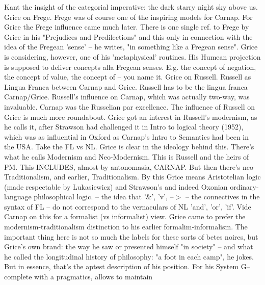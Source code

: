 \documentclass[10pt,titlepage]{book}
\begin{document}
{Kant the insight of the  categorial imperative: the dark starry night sky 
above us. 
Grice  on Frege. Frege was of course one of the inspiring models for 
Carnap. For  Grice the Frege influence came much later. There is one single ref. 
to Frege by  Grice in his "Prejudices and Predilections" and this only in 
connection with the  idea of the Fregean 'sense' -- he writes, "in something 
like a Fregean sense".  Grice is considering, however, one of his 
'metaphysical' routines. His Humean  projection is supposed to deliver concepts alla 
Fregean senses. E.g. the concept  of negation, the concept of value, the 
concept of -- you name  it. 
Grice  on Russell. Russell as Lingua Franca between Carnap and Grice. 
Russell has to be  the lingua franca Carnap/Grice. Russell's influence on Carnap, 
which was  actually two-way, was invaluable. Carnap was the Russelian par 
excellence. The  influence of Russell on Grice is much more roundabout. Grice 
got an interest in  Russell's modernism, as he calls it, after Strawson had 
challenged it in Intro  to logical theory (1952), which was as influential 
in Oxford as Carnap's Intro  to Semantics had been in the USA. Take the FL   
vs   NL.  Grice is clear in the ideology behind this. There's what he calls 
Modernism and  Neo-Modernism. This is Russell and the heirs of PM. This 
INCLUDES, almost by  antonomasia, CARNAP. But then there's neo-Traditionalism, 
and earlier,  Traditionalism. By this Grice means Aristotelian logic (made 
respectable by  Lukasiewicz) and Strawson's and indeed Oxonian 
ordinary-language philosophical  logic. 
--  the idea that '\&', 'v', --$>$ -- the connectives in the syntax of FL -- 
do  not correspond to the vernaculars of NL 'and', 'or', 'if'. Vide Carnap on 
this  for a formalist (vs informalist) view. Grice came to prefer the  
modernism-traditionalism distinction to his earlier formalim-informalism. The  
important thing here is not so much the labels for these sorts of betes 
noires,  but Grice's own brand: the way he saw or presented himself "in society" 
-- and  what he called the longitudinal history of philosophy: "a foot in 
each camp", he  jokes. But in essence, that's the aptest description of his 
position. For his  System G-- complete with a pragmatics, allows to maintain 
}
\end{document}
